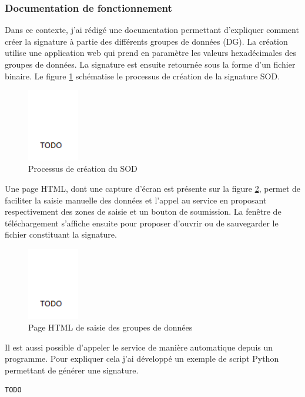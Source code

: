 
\subsubsection{Documentation de fonctionnement}
\label{Documentation de fonctionnement}

Dans ce contexte, j'ai rédigé une documentation permettant d'expliquer comment créer la signature à partie des différents groupes de données (DG).
La création utilise une application web qui prend en paramètre les valeurs hexadécimales des groupes de données.
La signature est ensuite retournée sous la forme d'un fichier binaire.
Le figure \ref{processus_SOD} schématise le processus de création de la signature SOD.
\begin{figure}[!h]
	\center
	\includegraphics[width=0.2\textwidth]{img/processus_SOD.png}
	\caption{Processus de création du SOD}
	\label{processus_SOD}
\end{figure}

Une page HTML, dont une capture d'écran est présente sur la figure \ref{saisie_DGs}, permet de faciliter la saisie manuelle des données et l'appel au service en proposant respectivement des zones de saisie et un bouton de soumission.
La fenêtre de téléchargement s'affiche ensuite pour proposer d'ouvrir ou de sauvegarder le fichier constituant la signature.
\begin{figure}[!h]
	\center
	\includegraphics[width=0.2\textwidth]{img/saisie_DGs.png}
	\caption{Page HTML de saisie des groupes de données}
	\label{saisie_DGs}
\end{figure}

Il est aussi possible d'appeler le service de manière automatique depuis un programme.
Pour expliquer cela j'ai développé un exemple de script Python permettant de générer une signature.
\begin{lstlisting}[language = sh]
TODO
\end{lstlisting}

